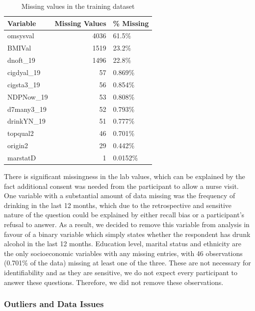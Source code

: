 \documentclass[
  11pt,
  twocolumn]{article}
\begin{document}
\begin{table}
\centering
\caption{\label{tab:outputnatable}Missing values in the training dataset\label{tab:output-na-table}}
\centering
\fontsize{9}{11}\selectfont
\begin{tabular}[t]{l|r|l}
\hline
\textbf{Variable} & \textbf{Missing Values} & \textbf{\% Missing}\\
\hline
omsysval & 4036 & 61.5\%\\
\hline
BMIVal & 1519 & 23.2\%\\
\hline
dnoft\_19 & 1496 & 22.8\%\\
\hline
cigdyal\_19 & 57 & 0.869\%\\
\hline
cigsta3\_19 & 56 & 0.854\%\\
\hline
NDPNow\_19 & 53 & 0.808\%\\
\hline
d7many3\_19 & 52 & 0.793\%\\
\hline
drinkYN\_19 & 51 & 0.777\%\\
\hline
topqual2 & 46 & 0.701\%\\
\hline
origin2 & 29 & 0.442\%\\
\hline
marstatD & 1 & 0.0152\%\\
\hline
\end{tabular}
\end{table}

There is significant missingness in the lab values, which can be
explained by the fact additional consent was needed from the participant
to allow a nurse visit. One variable with a substantial amount of data
missing was the frequency of drinking in the last 12 months, which due
to the retrospective and sensitive nature of the question could be
explained by either recall bias or a participant's refusal to answer. As
a result, we decided to remove this variable from analysis in favour of
a binary variable which simply states whether the respondent has drunk
alcohol in the last 12 months. Education level, marital status and
ethnicity are the only socioeconomic variables with any missing entries,
with 46 observations (0.701\% of the data) missing at least one of the
three. These are not necessary for identifiability and as they are
sensitive, we do not expect every participant to answer these questions.
Therefore, we did not remove these observations.

\subsubsection{Outliers and Data Issues}\label{outliers-and-data-issues}
\end{document}
